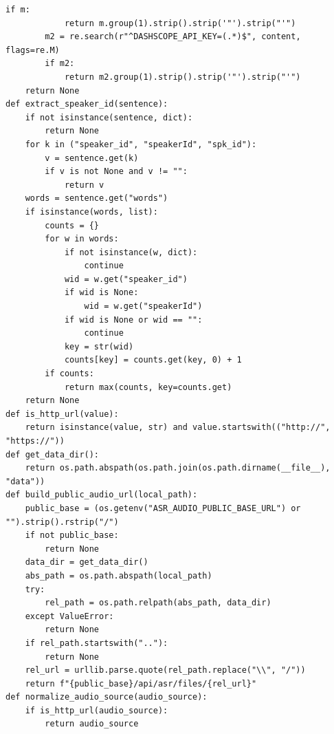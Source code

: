 \documentclass[12pt,a4paper]{article}
\begin{document}
\begin{Verbatim}[fontsize=\footnotesize]
        if m:
            return m.group(1).strip().strip('"').strip("'")
        m2 = re.search(r"^DASHSCOPE_API_KEY=(.*)$", content, flags=re.M)
        if m2:
            return m2.group(1).strip().strip('"').strip("'")
    return None
def extract_speaker_id(sentence):
    if not isinstance(sentence, dict):
        return None
    for k in ("speaker_id", "speakerId", "spk_id"):
        v = sentence.get(k)
        if v is not None and v != "":
            return v
    words = sentence.get("words")
    if isinstance(words, list):
        counts = {}
        for w in words:
            if not isinstance(w, dict):
                continue
            wid = w.get("speaker_id")
            if wid is None:
                wid = w.get("speakerId")
            if wid is None or wid == "":
                continue
            key = str(wid)
            counts[key] = counts.get(key, 0) + 1
        if counts:
            return max(counts, key=counts.get)
    return None
def is_http_url(value):
    return isinstance(value, str) and value.startswith(("http://", "https://"))
def get_data_dir():
    return os.path.abspath(os.path.join(os.path.dirname(__file__), "data"))
def build_public_audio_url(local_path):
    public_base = (os.getenv("ASR_AUDIO_PUBLIC_BASE_URL") or "").strip().rstrip("/")
    if not public_base:
        return None
    data_dir = get_data_dir()
    abs_path = os.path.abspath(local_path)
    try:
        rel_path = os.path.relpath(abs_path, data_dir)
    except ValueError:
        return None
    if rel_path.startswith(".."):
        return None
    rel_url = urllib.parse.quote(rel_path.replace("\\", "/"))
    return f"{public_base}/api/asr/files/{rel_url}"
def normalize_audio_source(audio_source):
    if is_http_url(audio_source):
        return audio_source
\end{Verbatim}
\newpage
{}
\fancyhead[R]{}
\end{document}
